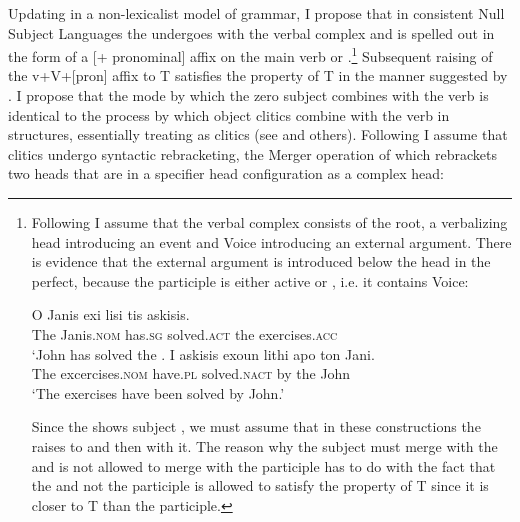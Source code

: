 \documentclass[output=paper]{LSP/langsci}
\begin{document}
Updating \citet{AlexiadouAnagnostopoulou1998} in a non-lexicalist model of grammar, I propose that in consistent Null Subject Languages the  undergoes  with the verbal complex and is spelled out in the form of a [+ pronominal] affix on the main verb or .\footnote{Following \citet{AlexiadouAnagnostopoulouSchäfer2006,AlexiadouAnagnostopoulouSchäfer2015} I assume that the verbal complex consists of the root, a verbalizing head introducing an event and Voice introducing an external argument. There is evidence that the external argument is introduced below the  head in the  perfect, because the participle is either active or , i.e. it contains Voice:
\begin{exe}
\begin{xlista}
 \ex \gll O Janis   exi lisi  tis askisis.\\
          The Janis.\textsc{nom}  has.\textsc{sg} solved.\textsc{act} the exercises.\textsc{acc}\\
     \glt ‘John has solved the .
 \ex \gll I askisis exoun  lithi apo ton Jani.\\
          The excercises.\textsc{nom} have.\textsc{pl} solved.\textsc{nact} by the John\\
      \glt ‘The exercises have been solved by John.’
\end{xlista}
\end{exe}

Since the  shows subject , we must assume that in these constructions the  raises to  and then  with it. The reason why the subject must merge with the  and is not allowed to merge with the participle has to do with the fact that the  and not the participle is allowed to satisfy the  property of T since it is closer to T than the participle.} Subsequent raising of the v+V+[pron] affix to T satisfies the  property of T in the manner suggested by \citet{AlexiadouAnagnostopoulou1998}. I  propose that the mode by which the zero subject combines with the verb is identical to the process by which object clitics combine with the  verb in  structures, essentially treating  as clitics (see \citealt{Sportiche1996,AlexiadouAnagnostopoulou1998,AlexiadouAnagnostopoulou2001} and others). Following \citet{Nevins2011} I assume that clitics undergo syntactic rebracketing, the Merger operation of \citet{Matushansky2006} which rebrackets two heads that are in a specifier head configuration as a complex head:
\end{document}
